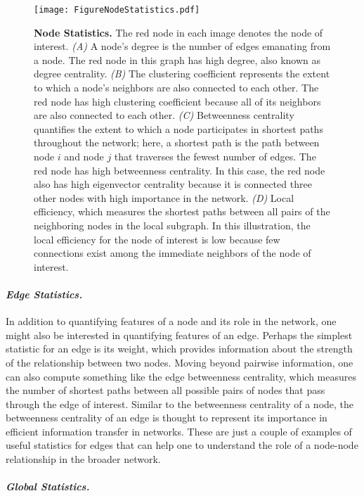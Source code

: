 \documentclass[12pt]{article}
\begin{document}
\begin{figure}[h!]
 	\centerline{\texttt{[image: FigureNodeStatistics.pdf]}}
 	\caption{\textbf{Node Statistics.} The red node in each image denotes the node of interest. \emph{(A)} A node's degree is the number of edges emanating from a node. The red node in this graph has high degree, also known as degree centrality. \emph{(B)} The clustering coefficient represents the extent to which a node's neighbors are also connected to each other. The red node has high clustering coefficient because all of its neighbors are also connected to each other. \emph{(C)} Betweenness centrality quantifies the extent to which a node participates in shortest paths throughout the network; here, a shortest path is the path between node $i$ and node $j$ that traverses the fewest number of edges. The red node has high betweenness centrality. In this case, the red node also has high eigenvector centrality because it is connected three other nodes with high importance in the network. \emph{(D)} Local efficiency, which measures the shortest paths between all pairs of the neighboring nodes in the local subgraph. In this illustration, the local efficiency for the node of interest is low because few connections exist among the immediate neighbors of the node of interest.}\label{fig:nodestatistics}
 	\centering
 \end{figure}
 

\paragraph{\emph{Edge Statistics.}}

In addition to quantifying features of a node and its role in the network, one might also be interested in quantifying features of an edge. Perhaps the simplest statistic for an edge is its weight, which provides information about the strength of the relationship between two nodes. Moving beyond pairwise information, one can also compute something like the edge betweenness centrality, which measures the number of shortest paths between all possible pairs of nodes that pass through the edge of interest. Similar to the betweenness centrality of a node, the betweenness centrality of an edge is thought to represent its importance in efficient information transfer in networks. These are just a couple of examples of useful statistics for edges that can help one to understand the role of a node-node relationship in the broader network. 

\paragraph{\emph{Global Statistics.}}
\end{document}
